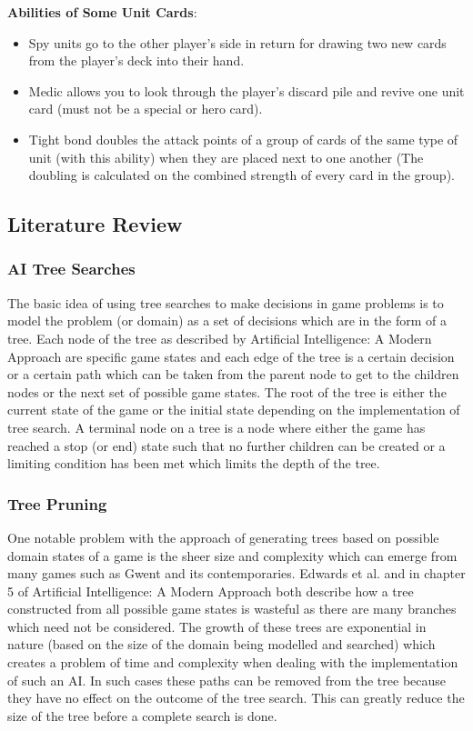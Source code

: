 \documentclass [11pt]{article}
\begin{document}
	\noindent \textbf{Abilities of Some Unit Cards}:
	\begin{itemize}
		\item Spy units go to the other player’s side in return for drawing two new cards from the player's deck into their hand.
		\item Medic allows you to look through the player's discard pile and revive one unit card (must not be a special or hero card).
		\item Tight bond doubles the attack points of a group of cards of the same type of unit (with this ability) when they are placed next to one another (The doubling is calculated on the combined strength of every card in the group).
	\end{itemize}
	
	\subsection{Literature Review}
	\subsubsection{AI Tree Searches}
	The basic idea of using tree searches to make decisions in game problems is to model the problem (or domain) as a set of decisions which are in the form of a tree. Each node of the tree as described by Artificial Intelligence: A Modern Approach \cite{AIModern} are specific game states and each edge of the tree is a certain decision or a certain path which can be taken from the parent node to get to the children nodes or the next set of possible game states. The root of the tree is either the current state of the game or the initial state depending on the implementation of tree search. A terminal node on a tree is a node where either the game has reached a stop (or end) state such that no further children can be created or a limiting condition has been met which limits the depth of the tree.
	
	\subsubsection{Tree Pruning}
	One notable problem with the approach of generating trees based on possible domain states of a game is the sheer size and complexity which can emerge from many games such as Gwent and its contemporaries. Edwards et al. \cite{AIM030} and in chapter 5 of Artificial Intelligence: A Modern Approach \cite{AIModern} both describe how a tree constructed from all possible game states is wasteful as there are many branches which need not be considered. The growth of these trees are exponential in nature (based on the size of the domain being modelled and searched) which creates a problem of time and complexity when dealing with the implementation of such an AI. In such cases these paths can be removed from the tree because they have no effect on the outcome of the tree search. This can greatly reduce the size of the tree before a complete search is done. \\
	
\end{document}
